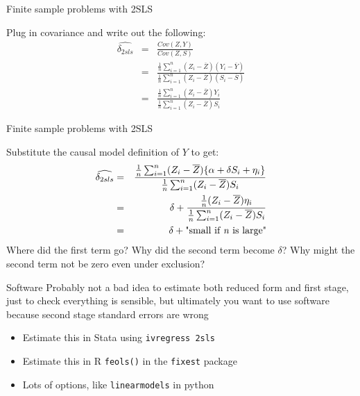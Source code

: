\documentclass{beamer}
\begin{document}
\begin{frame}{Finite sample problems with 2SLS}

  Plug in covariance and write out the following:
  \begin{eqnarray*}
    \widehat{\delta_{2sls}} &=& \frac{Cov(Z,Y)}{Cov(Z,S)} \\
    &=& \frac{ \frac{1}{n}\sum_{i=1}^n(Z_i - \overline{Z})(Y_i - \overline{Y})}{\frac{1}{n}\sum_{i=1}^n(Z_i - \overline{Z})(S_i - \overline{S})} \\
    &=& \frac{ \frac{1}{n} \sum_{i=1}^n(Z_i - \overline{Z})Y_i}{ \frac{1}{n} \sum_{i=1}^n (Z_i-\overline{Z})S_i}
  \end{eqnarray*}

\end{frame}

\begin{frame}{Finite sample problems with 2SLS}

  Substitute the causal model definition of $Y$ to get:
  \begin{eqnarray*}
    \widehat{\delta_{2sls} }&=& \frac{ \frac{1}{n} \sum_{i=1}^n (Z_i -\overline{Z})\{ \alpha + \delta{S}_i + \eta_i \}}{\frac{1}{n} \sum_{i=1}^n (Z_i - \overline{Z})S_i} \\
    &=& \delta + \frac{\frac{1}{n} (Z_i - \overline{Z})\eta_i}{\frac{1}{n}\sum_{i=1}^n(Z_i - \overline{Z})S_i} \\
    &=& \delta + \text{"small if \emph{n} is large"}
  \end{eqnarray*}Where did the first term go? Why did the second term become $\delta$? Why might the second term not be zero even under exclusion?

\end{frame}



\begin{frame}{Software}
  Probably not a bad idea to estimate both reduced form and first stage, just to check everything is sensible, but ultimately you want to use software because second stage standard errors are wrong

  \bigskip
  \begin{itemize}
    \item Estimate this in Stata using \texttt{ivregress 2sls} 
    \item Estimate this in R \texttt{feols()} in the \texttt{fixest} package
    \item Lots of options, like \texttt{linearmodels} in python

  \end{itemize}

\end{frame}
\end{document}
